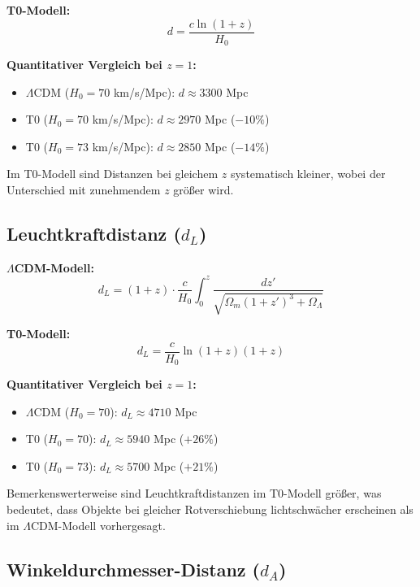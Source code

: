 \documentclass[a4paper,12pt]{article}
\theoremstyle{definition}
\theoremstyle{remark}
\begin{document}
	\textbf{T0-Modell:}
	\begin{equation}
		d = \frac{c \ln(1 + z)}{H_0}
	\end{equation}
	
	\textbf{Quantitativer Vergleich bei $z = 1$:}
	\begin{itemize}
		\item $\Lambda$CDM ($H_0 = 70$ km/s/Mpc): $d \approx 3300$ Mpc
		\item T0 ($H_0 = 70$ km/s/Mpc): $d \approx 2970$ Mpc ($-10\%$)
		\item T0 ($H_0 = 73$ km/s/Mpc): $d \approx 2850$ Mpc ($-14\%$)
	\end{itemize}
	
	Im T0-Modell sind Distanzen bei gleichem $z$ systematisch kleiner, wobei der Unterschied mit zunehmendem $z$ größer wird.
	
	\subsection{Leuchtkraftdistanz ($d_L$)}
	
	\textbf{$\Lambda$CDM-Modell:}
	\begin{equation}
		d_L = (1 + z) \cdot \frac{c}{H_0} \int_0^z \frac{dz'}{\sqrt{\Omega_m (1 + z')^3 + \Omega_\Lambda}}
	\end{equation}
	
	\textbf{T0-Modell:}
	\begin{equation}
		d_L = \frac{c}{H_0} \ln(1 + z) (1 + z)
	\end{equation}
	
	\textbf{Quantitativer Vergleich bei $z = 1$:}
	\begin{itemize}
		\item $\Lambda$CDM ($H_0 = 70$): $d_L \approx 4710$ Mpc
		\item T0 ($H_0 = 70$): $d_L \approx 5940$ Mpc ($+26\%$)
		\item T0 ($H_0 = 73$): $d_L \approx 5700$ Mpc ($+21\%$)
	\end{itemize}
	
	Bemerkenswerterweise sind Leuchtkraftdistanzen im T0-Modell größer, was bedeutet, dass Objekte bei gleicher Rotverschiebung lichtschwächer erscheinen als im $\Lambda$CDM-Modell vorhergesagt.
	
	\subsection{Winkeldurchmesser-Distanz ($d_A$)}
	
\end{document}
